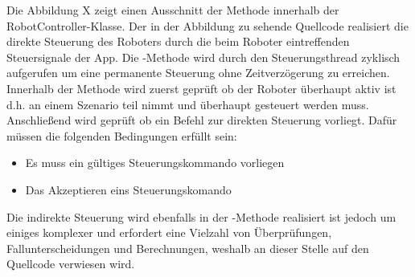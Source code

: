 \newline
Die Abbildung X zeigt einen Ausschnitt der Methode  innerhalb der RobotController-Klasse. Der in der Abbildung zu 
sehende Quellcode realisiert die direkte Steuerung des Roboters durch die beim Roboter eintreffenden Steuersignale der App. Die 
-Methode wird durch den Steuerungsthread zyklisch aufgerufen um eine permanente Steuerung ohne Zeitverzögerung
zu erreichen. \\
Innerhalb der Methode wird zuerst geprüft ob der Roboter überhaupt aktiv ist d.h. an einem Szenario teil nimmt und überhaupt gesteuert werden
muss. Anschließend wird geprüft ob ein Befehl zur direkten Steuerung vorliegt. Dafür müssen die folgenden Bedingungen erfüllt sein:
\begin{itemize}
	\item{Es muss ein gültiges Steuerungskommando vorliegen}
	\item{Das Akzeptieren eins Steuerungskomando}
\end{itemize}
Die indirekte Steuerung wird ebenfalls in der -Methode realisiert ist jedoch um einiges komplexer und erfordert eine
Vielzahl von Überprüfungen, Fallunterscheidungen und Berechnungen, weshalb an dieser Stelle auf den Quellcode verwiesen wird.
